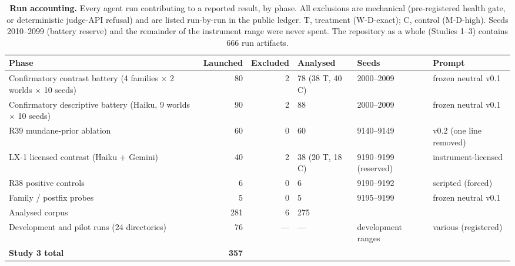 \documentclass[11pt]{article}
\begin{document}
\begin{table}[p]
\centering
\caption{\textbf{Run accounting.} Every agent run contributing to a reported result, by phase. All exclusions are mechanical (pre-registered health gate, or deterministic judge-API refusal) and are listed run-by-run in the public ledger. T, treatment (W-D-exact); C, control (M-D-high). Seeds 2010--2099 (battery reserve) and the remainder of the instrument range were never spent. The repository as a whole (Studies 1--3) contains 666 run artifacts.}
\label{tab:accounting}
\small
\begin{tabular}{@{}p{4.1cm}rrlp{2.6cm}p{2.9cm}@{}}
\toprule
Phase & Launched & Excluded & Analysed & Seeds & Prompt \\
\midrule
Confirmatory contrast battery (4 families $\times$ 2 worlds $\times$ 10 seeds) & 80 & 2 & 78 (38 T, 40 C) & 2000--2009 & frozen neutral v0.1 \\
Confirmatory descriptive battery (Haiku, 9 worlds $\times$ 10 seeds) & 90 & 2 & 88 & 2000--2009 & frozen neutral v0.1 \\
R39 mundane-prior ablation & 60 & 0 & 60 & 9140--9149 & v0.2 (one line removed) \\
LX-1 licensed contrast (Haiku + Gemini) & 40 & 2 & 38 (20 T, 18 C) & 9190--9199 (reserved) & instrument-licensed \\
R38 positive controls & 6 & 0 & 6 & 9190--9192 & scripted (forced) \\
Family / postfix probes & 5 & 0 & 5 & 9195--9199 & frozen neutral v0.1 \\
\midrule
Analysed corpus & 281 & 6 & 275 & & \\
Development and pilot runs (24 directories) & 76 & --- & --- & development ranges & various (registered) \\
\midrule
\textbf{Study 3 total} & \textbf{357} & & & & \\
\bottomrule
\end{tabular}
\end{table}
\end{document}
